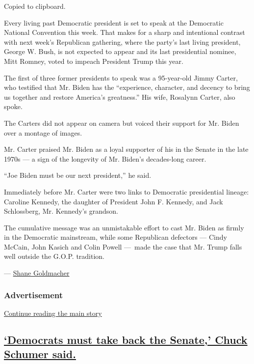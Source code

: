 Copied to clipboard.

Every living past Democratic president is set to speak at the Democratic
National Convention this week. That makes for a sharp and intentional
contrast with next week's Republican gathering, where the party's last
living president, George W. Bush, is not expected to appear and its last
presidential nominee, Mitt Romney, voted to impeach President Trump this
year.

The first of three former presidents to speak was a 95-year-old Jimmy
Carter, who testified that Mr. Biden has the ``experience, character,
and decency to bring us together and restore America's greatness.'' His
wife, Rosalynn Carter, also spoke.

The Carters did not appear on camera but voiced their support for Mr.
Biden over a montage of images.

Mr. Carter praised Mr. Biden as a loyal supporter of his in the Senate
in the late 1970s --- a sign of the longevity of Mr. Biden's
decades-long career.

``Joe Biden must be our next president,'' he said.

Immediately before Mr. Carter were two links to Democratic presidential
lineage: Caroline Kennedy, the daughter of President John F. Kennedy,
and Jack Schlossberg, Mr. Kennedy's grandson.

The cumulative message was an unmistakable effort to cast Mr. Biden as
firmly in the Democratic mainstream, while some Republican defectors ---
Cindy McCain, John Kasich and Colin Powell ---~made the case that Mr.
Trump falls well outside the G.O.P. tradition.

--- \href{https://www.nytimes3xbfgragh.onion/by/shane-goldmacher}{Shane
Goldmacher}

\hypertarget{advertisement-3}{%
\subsubsection{Advertisement}\label{advertisement-3}}

\protect\hyperlink{after-dfp-ad-mid4}{Continue reading the main story}

\hypertarget{democrats-must-take-back-the-senate-chuck-schumer-said}{%
\subsection{\texorpdfstring{\protect\hyperlink{democrats-must-take-back-the-senate-chuck-schumer-said}{`Democrats
must take back the Senate,' Chuck Schumer
said.}}{`Democrats must take back the Senate,' Chuck Schumer said.}}\label{democrats-must-take-back-the-senate-chuck-schumer-said}}

